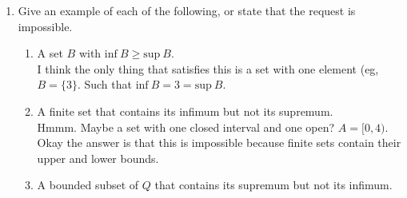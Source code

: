 \documentclass{article}
\numberwithin{equation}{subsection}
\theoremstyle{definition}
\newtheorem{lemma}{Lemma}
\begin{document}
\begin{enumerate}
\begin{enumerate}
\begin{lemma}
\begin{proof}
                    Proving it backwards. Assume $i \in \mathbb{R}$ is a lower bound on
                    set $A \subseteq \mathbb{R}$. If for every choice of $\epsilon > 0$,
                    $i + \epsilon \geq a$ for some $a \in A$, then $i = \text{inf}~A$.
                    Intuitively, it's clear that, if $i$ is a lower bound, and any nudge
                    in the positive direction causes $i$ to no longer be a lower bound,
                    then $i$ must be the greatest lower bound. I can also propose an
                    arbitrary lower bound $b$. Part (ii) of the definition requires that
                    $i \geq b$. Then I guess this is self evident because anything greater
                    than $i$ would no longer be a lower bound... ? But I struggle with
                    that step because $i = \text{inf}~A$ is the conclusion we're trying to
                    prove here, but the solution kind of relies on that as a premise to
                    support the claim $i \geq b$. Puzzling.
                    
                \end{proof}
            \end{lemma}

    \end{enumerate}
    \item Give an example of each of the following, or state that the request is
        impossible.\\
        \begin{enumerate}
            \item A set $B$ with $\text{inf}~B \geq \text{sup}~B$.\\
                I think the only thing that satisfies this is a set with one element (eg,
                $B = \{3\}$. Such that $\text{inf}~B = 3 = \text{sup}~B$.

            \item A finite set that contains its infimum but not its supremum.\\

                Hmmm. Maybe a set with one closed interval and one open? $A = [0, 4)$.\\

                Okay the answer is that this is impossible because finite sets contain
                their upper and lower bounds.

            \item A bounded subset of $Q$ that contains its supremum but not its
                infimum.\\


\end{enumerate}
\end{enumerate}
\end{document}
